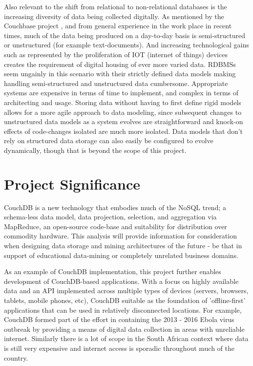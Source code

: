 Also relevant to the shift from relational to non-relational databases is the increasing diversity of data being collected digitally. As mentioned by the Couchbase project \cite{couchbaseWhitePaper}, and from general experience in the work place in recent times, much of the data being produced on a day-to-day basis is semi-structured or unstructured (for example text-documents). And increasing technological gains such as represented by the proliferation of IOT (internet of things) devices creates the requirement of digital housing of ever more varied data. RDBMSs seem ungainly in this scenario with their strictly defined data models making handling semi-structured and unstructured data cumbersome. Appropriate systems are expensive in terms of time to implement, and complex in terms of architecting and usage. Storing data without having to first define rigid models allows for a more agile approach to data modeling, since subsequent changes to unstructured data models as a system evolves are straightforward and knock-on effects of code-changes isolated are much more isolated. Data models that don't rely on structured data storage can also easily be configured to evolve dynamically, though that is beyond the scope of this project.

\section{Project Significance}
CouchDB is a new technology that embodies much of the NoSQL trend; a schema-less data model, data projection, selection, and aggregation via MapReduce, an open-source code-base and suitability for distribution over commodity hardware. This analysis will provide information for consideration when designing data storage and mining architectures of the future - be that in support of educational data-mining or completely unrelated business domains.

As an example of CouchDB implementation, this project further enables development of CouchDB-based applications. With a focus on highly available data and an API implemented across multiple types of devices (servers, browsers, tablets, mobile phones, etc), CouchDB suitable as the foundation of 'offline-first' applications that can be used in relatively disconnected locations. For example, CouchDB formed part of the effort in containing the 2013 - 2016 Ebola virus outbreak \cite{ebola2017} by providing a means of digital data collection in areas with unreliable internet. Similarly there is a lot of scope in the South African context where data is still very expensive and internet access is sporadic throughout much of the country.

